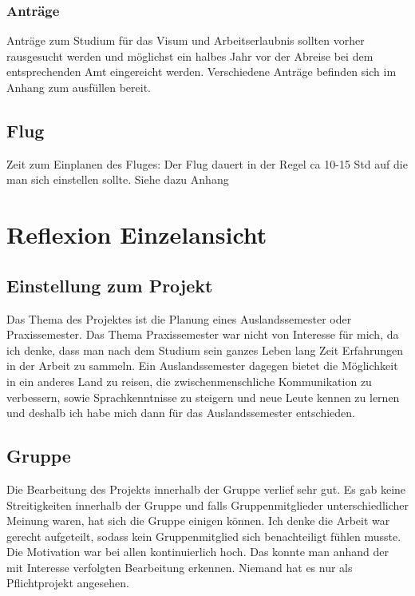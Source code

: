 \documentclass[11pt]{article}
\begin{document}
\subsubsection{Anträge}
Anträge zum Studium für das Visum und Arbeitserlaubnis sollten vorher rausgesucht werden und möglichst ein halbes Jahr vor der Abreise bei dem entsprechenden Amt eingereicht werden. Verschiedene Anträge befinden sich im Anhang zum ausfüllen bereit.

\subsection{Flug}
Zeit zum Einplanen des Fluges: Der Flug dauert in der Regel ca 10-15 Std auf die man sich einstellen sollte.
Siehe dazu Anhang

\section{Reflexion Einzelansicht}
\subsection{Einstellung zum Projekt}

Das Thema des Projektes ist die Planung eines Auslandssemester oder Praxissemester. Das Thema Praxissemester war nicht von Interesse für mich, da ich denke, dass man nach dem Studium sein ganzes Leben lang Zeit Erfahrungen in der Arbeit zu sammeln. Ein Auslandssemester dagegen bietet die Möglichkeit in ein anderes Land zu reisen, die zwischenmenschliche  Kommunikation zu verbessern, sowie Sprachkenntnisse zu steigern und neue Leute kennen zu lernen und deshalb ich habe mich dann für das Auslandssemester entschieden. 



\subsection{Gruppe}

Die Bearbeitung des Projekts innerhalb der Gruppe verlief sehr gut. Es gab keine Streitigkeiten innerhalb der Gruppe und falls Gruppenmitglieder unterschiedlicher Meinung waren, hat sich die Gruppe einigen können. Ich denke die Arbeit war gerecht aufgeteilt, sodass kein Gruppenmitglied sich benachteiligt fühlen musste. Die Motivation war bei allen kontinuierlich hoch. Das konnte man anhand der mit Interesse verfolgten Bearbeitung erkennen. Niemand hat es nur als Pflichtprojekt angesehen.
\end{document}
